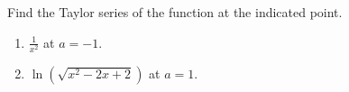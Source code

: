 Find the Taylor series of the function at the indicated point.
\begin{enumerate}
\item  $\frac{1}{x^2}$ at $a=-1$.


\item \label{problemTaylorSeries a=1 ln(sqrt(x^2-2x+2))}
$\ln \left( \sqrt{x^2-2x+2} \right)$ at $a=1$.

\end{enumerate}

